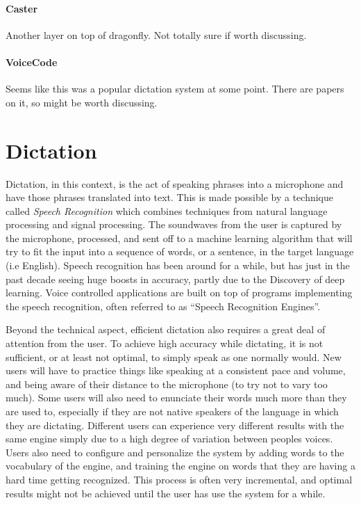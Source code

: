 \documentclass[../thesis.tex]{subfiles}
\begin{document}
\paragraph{Caster}
Another layer on top of dragonfly. Not totally sure if worth discussing.

\paragraph{VoiceCode}
Seems like this was a popular dictation system at some point. There are papers on it, so might be worth discussing.

\section{Dictation}
Dictation, in this context, is the act of speaking phrases into a microphone and have those phrases translated into text.
This is made possible by a technique called \textit{Speech Recognition} which combines techniques from natural language processing
and signal processing. The soundwaves from the user is captured by the microphone, processed, and sent off to a machine learning algorithm
that will try to fit the input into a sequence of words, or a sentence, in the target language (i.e English). Speech recognition
has been around for a while, but has just in the past decade seeing huge boosts in accuracy, partly due to the Discovery of deep learning.
Voice controlled applications are built on top of programs implementing the speech recognition, often referred to as ``Speech Recognition Engines''.

Beyond the technical aspect, efficient dictation also requires a great deal of attention from the user.
To achieve high accuracy while dictating, it is not sufficient, or at least not optimal, to simply speak as one normally would.
New users will have to practice things like speaking at a consistent pace and volume, and being aware of their distance to the microphone (to try not to vary too much).
Some users will also need to enunciate their words much more than they are used to, especially if they are not native speakers of the language in which they are dictating.
Different users can experience very different results with the same engine simply due to a high degree of variation between peoples voices.
Users also need to configure and personalize the system by adding words to the vocabulary of the engine, and training the engine on words that they are
having a hard time getting recognized. This process is often very incremental, and optimal results might not be achieved until the user has
use the system for a while.
\end{document}
